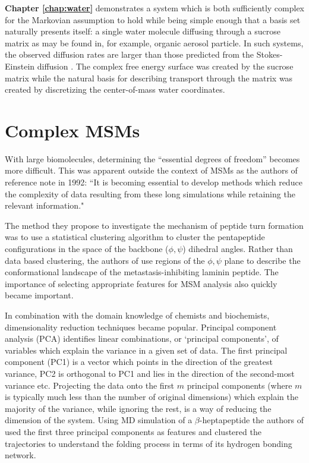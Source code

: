 \textbf{Chapter \ref{chap:water}} demonstrates a system which is both sufficiently complex for the Markovian assumption to hold while being simple enough that a basis set naturally presents itself: a single water molecule diffusing through a sucrose matrix as may be found in, for example, organic aerosol particle\cite{songTransientCavityDynamics2020a}. In such systems, the observed diffusion rates  are larger than those predicted from the Stokes-Einstein diffusion \cite{songTransientCavityDynamics2020a}. The complex free energy surface was created by the sucrose matrix while the natural basis for describing transport through the matrix was created by discretizing the center-of-mass water coordinates. 

\section{Complex MSMs}
With large biomolecules, determining the ``essential degrees of freedom'' \cite{schutteDirectApproachConformational1999} becomes more difficult. This was apparent outside the context of MSMs as the authors of  reference \cite{karpen1993statistical} note in 1992: 
``It is becoming essential to develop methods which reduce the complexity of data resulting from these long simulations while retaining the relevant information."

The method they propose to investigate the mechanism of peptide turn formation was to use a statistical clustering algorithm to cluster the pentapeptide configurations in the space of the backbone ($\phi, \psi$) dihedral angles. Rather than data based clustering, the authors of \cite{mckelveyCHARMMAnalysisConformations1991} use regions of the $\phi, \psi$ plane to describe the conformational landscape of the metastasis-inhibiting laminin peptide. The importance of selecting appropriate features for MSM analysis also quickly became important. 

In combination with the domain knowledge of chemists and biochemists, dimensionality reduction \cite{friedman2001elements} techniques became popular.  Principal component analysis (PCA) \cite{leverPrincipalComponentAnalysis2017} identifies linear combinations, or `principal components', of variables which explain the variance in a given set of data. The first principal component (PC1) is a vector which points in the direction of the greatest variance, PC2 is orthogonal to PC1 and lies in the direction of the second-most variance etc. Projecting the data onto the first $m$ principal components (where $m$ is typically much less than the number of original dimensions) which explain the majority of the variance, while ignoring the rest, is a way of reducing the dimension of the system. Using MD simulation of a $\beta$-heptapeptide the authors of \cite{degrootEssentialDynamicsReversible2001} used the first three principal components as features and clustered the trajectories to understand the folding process in terms of its hydrogen bonding network. 

